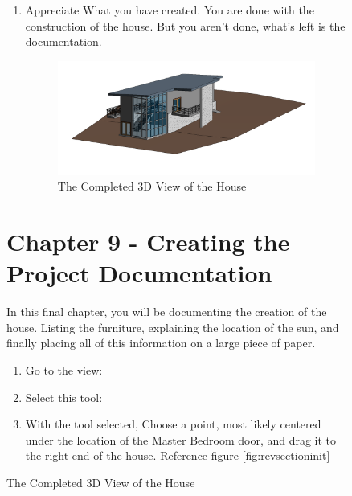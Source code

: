 \documentclass{tufte-book} %
\begin{document}
\begin{figure}
\begin{enumerate}
	\item Appreciate What you have created. You are done with the construction of the house. But you aren't done, what's left is the documentation.
	
	\begin{figure}
		\includegraphics[width=\linewidth]{revitfinalthreed.png}
		\caption{The Completed 3D View of the House}
		\label{fig:revthreedfinalhouse}
	\end{figure}
\end{enumerate}


\chapter{Chapter 9 - Creating the Project Documentation}
\label{ch:9}
In this final chapter, you will be documenting the creation of the house. Listing the furniture, explaining the location of the sun, and finally placing all of this information on a large piece of paper.
\begin{enumerate}


\section{Creating Section Views}
	\item Go to the view: 
	\item Select this tool: 
	\item With the tool selected, Choose a point, most likely centered under the location of the Master Bedroom door, and drag it to the right end of the house. Reference figure \ref{fig:revsectioninit}


\end{enumerate}
\end{figure}
\end{document}
